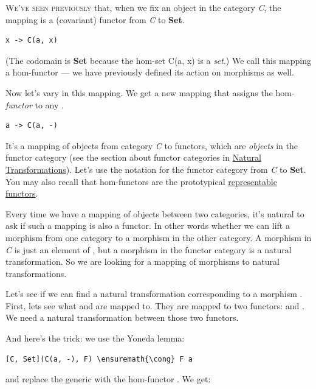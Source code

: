 \lettrine[lhang=0.17]{W}{e've seen previously} that, when we fix an object  in the
category \emph{C}, the mapping  is a (covariant)
functor from \emph{C} to \textbf{Set}.

\begin{Verbatim}[commandchars=\\\{\}]
x -> C(a, x)
\end{Verbatim}
(The codomain is \textbf{Set} because the hom-set C(a, x) is a
\emph{set}.) We call this mapping a hom-functor --- we have previously
defined its action on morphisms as well.

Now let's vary  in this mapping. We get a new mapping that
assigns the hom-\emph{functor}  to any .

\begin{Verbatim}[commandchars=\\\{\}]
a -> C(a, -)
\end{Verbatim}
It's a mapping of objects from category \emph{C} to functors, which are
\emph{objects} in the functor category (see the section about functor
categories in
\hyperref[natural-transformations]{Natural
Transformations}). Let's use the notation \code{{[}C, Set{]}} for the
functor category from \emph{C} to \textbf{Set}. You may also recall that
hom-functors are the prototypical
\hyperref[representable-functors]{representable
functors}.

Every time we have a mapping of objects between two categories, it's
natural to ask if such a mapping is also a functor. In other words
whether we can lift a morphism from one category to a morphism in the
other category. A morphism in \emph{C} is just an element of
, but a morphism in the functor category
\code{{[}C, Set{]}} is a natural transformation. So we are looking
for a mapping of morphisms to natural transformations.

Let's see if we can find a natural transformation corresponding to a
morphism . First, lets see what
 and  are mapped to. They are mapped to two
functors:  and . We need a natural
transformation between those two functors.

And here's the trick: we use the Yoneda lemma:

\begin{Verbatim}[commandchars=\\\{\}]
[C, Set](C(a, -), F) \ensuremath{\cong} F a
\end{Verbatim}
and replace the generic  with the hom-functor
. We get:


